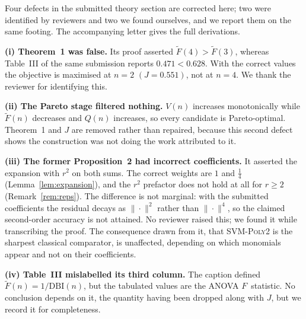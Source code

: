 Four defects in the submitted theory section are corrected here; two were
identified by reviewers and two we found ourselves, and we report them on the
same footing. The accompanying letter gives the full derivations.

\textbf{(i) Theorem~1 was false.} Its proof asserted
$\widetilde{F}(4) > \widetilde{F}(3)$, whereas Table~III of the same submission
reports $0.471 < 0.628$. With the correct values the objective is maximised at
$n=2$ $(J=0.551)$, not at $n=4$. We thank the reviewer for identifying this.

\textbf{(ii) The Pareto stage filtered nothing.} $V(n)$ increases monotonically
while $\widetilde{F}(n)$ decreases and $Q(n)$ increases, so every candidate is
Pareto-optimal. Theorem~1 and $J$ are removed rather than repaired, because this
second defect shows the construction was not doing the work attributed to it.

\textbf{(iii) The former Proposition~2 had incorrect coefficients.} It asserted
the expansion with $r^{2}$ on both sums. The correct weights are $1$ and
$\tfrac{1}{4}$ (Lemma~\ref{lem:expansion}), and the $r^{2}$ prefactor does not hold
at all for $r\ge2$ (Remark~\ref{rem:reps}). The difference is not marginal: with
the submitted coefficients the residual decays as $\|\cdot\|^{2}$ rather than
$\|\cdot\|^{4}$, so the claimed second-order accuracy is not attained. No reviewer
raised this; we found it while transcribing the proof. The consequence drawn
from it, that SVM-\textsc{Poly2} is the sharpest classical comparator, is
unaffected, depending on which monomials appear and not on their coefficients.

\textbf{(iv) Table~III mislabelled its third column.} The caption defined
$\widetilde{F}(n)=1/\mathrm{DBI}(n)$, but the tabulated values are the ANOVA
$F$~statistic. No conclusion depends on it, the quantity having been dropped
along with $J$, but we record it for completeness.
